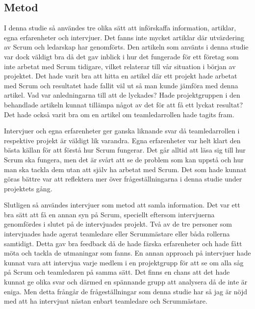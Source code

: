 \subsection{Metod}
I denna studie så användes tre olika sätt att införskaffa information, artiklar, egna erfarenheter och intervjuer. 
Det fanns inte mycket artiklar där utvärdering av Scrum och ledarskap har genomförts. 
Den artikeln som använts i denna studie var dock väldigt bra då det gav inblick i hur det fungerade för ett företag som inte arbetat med Scrum tidigare, vilket relaterar till vår situation i början av projektet. 
Det hade varit bra att hitta en artikel där ett projekt hade arbetat med Scrum och resultatet hade fallit väl ut så man kunde jämföra med denna artikel. 
Vad var anledningarna till att de lyckades? 
Hade projektgruppen i den behandlade artikeln kunnat tillämpa något av det för att få ett lyckat resultat?
Det hade också varit bra om en artikel om teamledarrollen hade tagits fram. 

Intervjuer och egna erfarenheter ger ganska liknande svar då teamledarrollen i respektive projekt är väldigt lik varandra.
Egna erfarenheter var helt klart den bästa källan för att förstå hur Scrum fungerar. 
Det går alltid att läsa sig till hur Scrum ska fungera, men det är svårt att se de problem som kan uppstå och hur man ska tackla dem utan att själv ha arbetat med Scrum. 
Det som hade kunnat göras bättre var att reflektera mer över frågeställningarna i denna studie under projektets gång. 

Slutligen så användes intervjuer som metod att samla information. 
Det var ett bra sätt att få en annan syn på Scrum, speciellt eftersom intervjuerna genomfördes i slutet på de intervjuades projekt. 
Två av de tre personer som intervjuades hade agerat teamledare eller Scrummästare eller båda rollerna samtidigt. 
Detta gav bra feedback då de hade färska erfarenheter och hade fått möta och tackla de utmaningar som fanns. 
En annan approach på intervjuer hade kunnat vara att intervjua varje medlem i en projektgrupp för att se om alla såg på Scrum och teamledaren på samma sätt. 
Det finns en chans att det hade kunnat ge olika svar och därmed en spännande grupp att analysera då de inte är eniga. 
Men detta frångår de frågeställningar som denna studie har så jag är nöjd med att ha intervjuat nästan enbart teamledare och Scrummästare.

